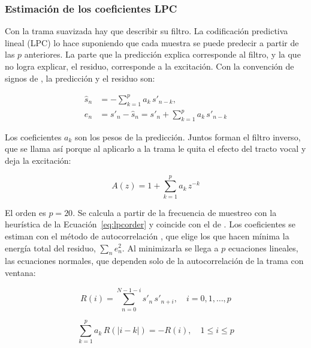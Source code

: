 \documentclass[10pt,twocolumn]{article}
\newcommand{\textcite}[1]{\citet{#1}}
\newcommand{\parencite}[1]{\citep{#1}}
\begin{document}
\subsubsection{Estimación de los coeficientes LPC}\label{sec:4.3.2}

Con la trama suavizada hay que describir su filtro. La codificación predictiva lineal (LPC) lo hace suponiendo que cada muestra se puede predecir a partir de las $p$ anteriores. La parte que la predicción explica corresponde al filtro, y la que no logra explicar, el residuo, corresponde a la excitación. Con la convención de signos de \textcite{makhoul1975}, la predicción y el residuo son:

\begin{equation}\label{eq:lpc_pred_res}
\begin{aligned}
\hat{s}_n &= -\sum_{k=1}^{p} a_k\,s'_{n-k}, \\
e_n &= s'_n-\hat{s}_n
    = s'_n+\sum_{k=1}^{p} a_k\,s'_{n-k}
\end{aligned}
\end{equation}

\noindent Los coeficientes $a_k$ son los pesos de la predicción. Juntos forman el filtro inverso, que se llama así porque al aplicarlo a la trama le quita el efecto del tracto vocal y deja la excitación:

\begin{equation}\label{eq:lpc_az}
A(z)=1+\sum_{k=1}^{p}a_k\,z^{-k}
\end{equation}

\noindent El orden es $p=20$. Se calcula a partir de la frecuencia de muestreo con la heurística de la Ecuación~\ref{eq:lpcorder} y coincide con el de \textcite{patino2021}. Los coeficientes se estiman con el método de autocorrelación \parencite{makhoul1975}, que elige los que hacen mínima la energía total del residuo, $\sum_n e_n^2$. Al minimizarla se llega a $p$ ecuaciones lineales, las ecuaciones normales, que dependen solo de la autocorrelación de la trama con ventana:

\begin{equation}\label{eq:lpc_autocorr}
R(i)=\sum_{n=0}^{N-1-i}s'_n\,s'_{n+i},
\quad i=0,1,\ldots,p
\end{equation}

\begin{equation}\label{eq:lpc_normal}
\sum_{k=1}^{p}a_k\,R(|i-k|)=-R(i),
\quad 1\le i\le p
\end{equation}
\end{document}
